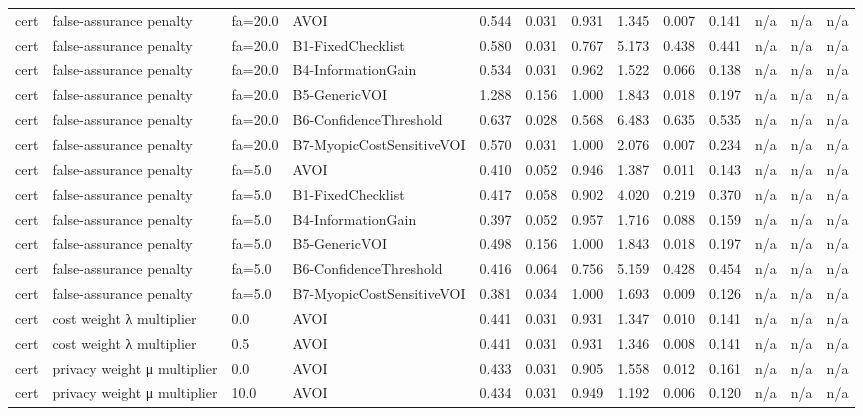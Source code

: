 \begin{table}[!ht]
{\begin{tabular}{lllllllllllll}
cert & false-assurance penalty & fa=20.0 & AVOI & 0.544 & 0.031 & 0.931 & 1.345 & 0.007 & 0.141 & n/a & n/a & n/a \\
cert & false-assurance penalty & fa=20.0 & B1-FixedChecklist & 0.580 & 0.031 & 0.767 & 5.173 & 0.438 & 0.441 & n/a & n/a & n/a \\
cert & false-assurance penalty & fa=20.0 & B4-InformationGain & 0.534 & 0.031 & 0.962 & 1.522 & 0.066 & 0.138 & n/a & n/a & n/a \\
cert & false-assurance penalty & fa=20.0 & B5-GenericVOI & 1.288 & 0.156 & 1.000 & 1.843 & 0.018 & 0.197 & n/a & n/a & n/a \\
cert & false-assurance penalty & fa=20.0 & B6-ConfidenceThreshold & 0.637 & 0.028 & 0.568 & 6.483 & 0.635 & 0.535 & n/a & n/a & n/a \\
cert & false-assurance penalty & fa=20.0 & B7-MyopicCostSensitiveVOI & 0.570 & 0.031 & 1.000 & 2.076 & 0.007 & 0.234 & n/a & n/a & n/a \\
cert & false-assurance penalty & fa=5.0 & AVOI & 0.410 & 0.052 & 0.946 & 1.387 & 0.011 & 0.143 & n/a & n/a & n/a \\
cert & false-assurance penalty & fa=5.0 & B1-FixedChecklist & 0.417 & 0.058 & 0.902 & 4.020 & 0.219 & 0.370 & n/a & n/a & n/a \\
cert & false-assurance penalty & fa=5.0 & B4-InformationGain & 0.397 & 0.052 & 0.957 & 1.716 & 0.088 & 0.159 & n/a & n/a & n/a \\
cert & false-assurance penalty & fa=5.0 & B5-GenericVOI & 0.498 & 0.156 & 1.000 & 1.843 & 0.018 & 0.197 & n/a & n/a & n/a \\
cert & false-assurance penalty & fa=5.0 & B6-ConfidenceThreshold & 0.416 & 0.064 & 0.756 & 5.159 & 0.428 & 0.454 & n/a & n/a & n/a \\
cert & false-assurance penalty & fa=5.0 & B7-MyopicCostSensitiveVOI & 0.381 & 0.034 & 1.000 & 1.693 & 0.009 & 0.126 & n/a & n/a & n/a \\
cert & cost weight λ multiplier & 0.0 & AVOI & 0.441 & 0.031 & 0.931 & 1.347 & 0.010 & 0.141 & n/a & n/a & n/a \\
cert & cost weight λ multiplier & 0.5 & AVOI & 0.441 & 0.031 & 0.931 & 1.346 & 0.008 & 0.141 & n/a & n/a & n/a \\
cert & privacy weight μ multiplier & 0.0 & AVOI & 0.433 & 0.031 & 0.905 & 1.558 & 0.012 & 0.161 & n/a & n/a & n/a \\
cert & privacy weight μ multiplier & 10.0 & AVOI & 0.434 & 0.031 & 0.949 & 1.192 & 0.006 & 0.120 & n/a & n/a & n/a \\

\end{tabular}}
\end{table}
